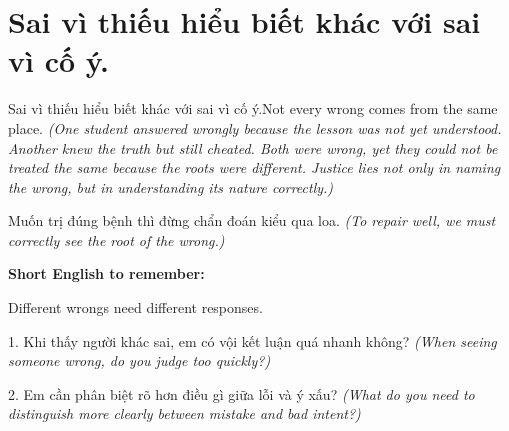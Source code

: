 \section{Sai vì thiếu hiểu biết khác với sai vì cố ý.}
\begin{truyen}{Sai vì thiếu hiểu biết khác với sai vì cố ý.}{Not every wrong comes from the same place.}
\textit{(One student answered wrongly because the lesson was not yet understood. Another knew the truth but still cheated. Both were wrong, yet they could not be treated the same because the roots were different. Justice lies not only in naming the wrong, but in understanding its nature correctly.)}
\end{truyen}
\begin{baihoc}
Muốn trị đúng bệnh thì đừng chẩn đoán kiểu qua loa.
\textit{(To repair well, we must correctly see the root of the wrong.)}
\end{baihoc}
\begin{ghinhoanh}
\textbf{Short English to remember:}

Different wrongs need different responses.
\end{ghinhoanh}
\begin{tuhocnhanh}
1. Khi thấy người khác sai, em có vội kết luận quá nhanh không? \textit{(When seeing someone wrong, do you judge too quickly?)}

2. Em cần phân biệt rõ hơn điều gì giữa lỗi và ý xấu? \textit{(What do you need to distinguish more clearly between mistake and bad intent?)}
\end{tuhocnhanh}
\ngancach

